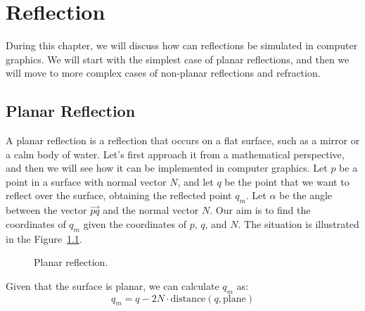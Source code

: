 \chapter{Reflection}

During this chapter, we will discuss how can reflections be simulated in computer graphics. We will start with the simplest case of planar reflections, and then we will move to more complex cases of non-planar reflections and refraction.

\section{Planar Reflection}

A planar reflection is a reflection that occurs on a flat surface, such as a mirror or a calm body of water. Let's first approach it from a mathematical perspective, and then we will see how it can be implemented in computer graphics. Let $p$ be a point in a surface with normal vector $N$, and let $q$ be the point that we want to reflect over the surface, obtaining the reflected point $q_m$. Let $\alpha$ be the angle between the vector $\vec{pq}$ and the normal vector $N$. Our aim is to find the coordinates of $q_m$ given the coordinates of $p$, $q$, and $N$. The situation is illustrated in the Figure~\ref{fig:planar_reflection}.
\begin{figure}
    \centering

    \caption{Planar reflection.}
    \label{fig:planar_reflection}
\end{figure}

Given that the surface is planar, we can calculate $q_m$ as:
\begin{equation*}
    q_m = q - 2N \cdot \text{distance}(q, \text{plane})
\end{equation*}

